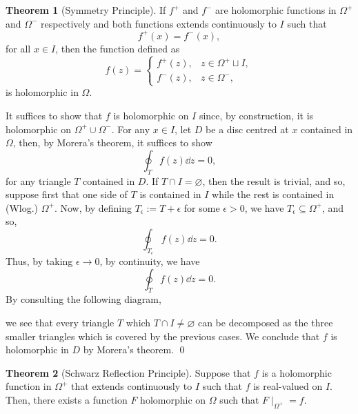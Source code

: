 \documentclass[
]{article}
\theoremstyle{definition}
\newtheorem{theorem}{Theorem}
\theoremstyle{definition}
\begin{document}
\begin{theorem}[Symmetry Principle]
  If \(f^+\) and \(f^-\) are holomorphic functions in \(\Omega^+\) and \(\Omega^-\) 
  respectively and both functions extends continuously to \(I\) such that 
  \[f^+(x) = f^-(x),\]
  for all \(x \in I\), then the function defined as 
  \[f(z) = 
    \begin{cases}
      f^+(z), & z \in \Omega^+ \sqcup I,\\
      f^-(z), & z \in \Omega^-,
    \end{cases}\]
  is holomorphic in \(\Omega\).
\end{theorem}
\proof

It suffices to show that \(f\) is holomorphic on \(I\) since, by
construction, it is holomorphic on \(\Omega^+ \cup \Omega^-\). For any
\(x \in I\), let \(D\) be a disc centred at \(x\) contained in
\(\Omega\), then, by Morera's theorem, it suffices to show
\[\oint_T f(z) \dd z = 0,\] for any triangle \(T\) contained in \(D\).
If \(T \cap I = \varnothing\), then the result is trivial, and so,
suppose first that one side of \(T\) is contained in \(I\) while the
rest is contained in (Wlog.) \(\Omega^+\). Now, by defining
\(T_\epsilon := T + \epsilon\) for some \(\epsilon > 0\), we have
\(T_\epsilon \subseteq \Omega^+\), and so,
\[\oint_{T_\epsilon} f(z) \dd z = 0.\] Thus, by taking
\(\epsilon \to 0\), by continuity, we have \[\oint_T f(z) \dd z = 0.\]
By consulting the following diagram,

\begin{center}
  \end{center}

we see that every triangle \(T\) which \(T \cap I \neq \varnothing\) can
be decomposed as the three smaller triangles which is covered by the
previous cases. We conclude that \(f\) is holomorphic in \(D\) by
Morera's theorem. \qed

\begin{theorem}[Schwarz Reflection Principle]
  Suppose that \(f\) is a holomorphic function in \(\Omega^+\) that extends 
  continuously to \(I\) such that \(f\) is real-valued on \(I\). Then, there exists 
  a function \(F\) holomorphic on \(\Omega\) such that \(F \mid_{\Omega^+} = f\).
\end{theorem}
\end{document}

